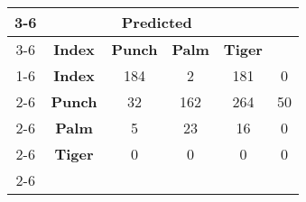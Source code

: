 \documentclass{standalone}
\begin{document}
 
 \begin{tabular}{|c |c |c |c |c |c |}
\cline{3-6}\multicolumn{2}{c|}{} & \multicolumn{4}{c|}{\textbf{Predicted}} \\ 
\cline{3-6} \multicolumn{2}{c |}{ } & \textbf{Index} & \textbf{Punch} & \textbf{Palm} & \textbf{Tiger}\\ 
\cline{1-6}\multirow{4}{*}{\rotatebox[origin=c]{90}{\textbf{Actual}}} & \textbf{Index} & 184 & 2 & 181 & 0\\ 
 \cline{2-6} & \textbf{Punch} & 32 & 162 & 264 & 50\\ 
 \cline{2-6} & \textbf{Palm} & 5 & 23 & 16 & 0\\ 
 \cline{2-6} & \textbf{Tiger} & 0 & 0 & 0 & 0\\ 
 \cline{2-6}\hline \end{tabular}
 
\end{document}
